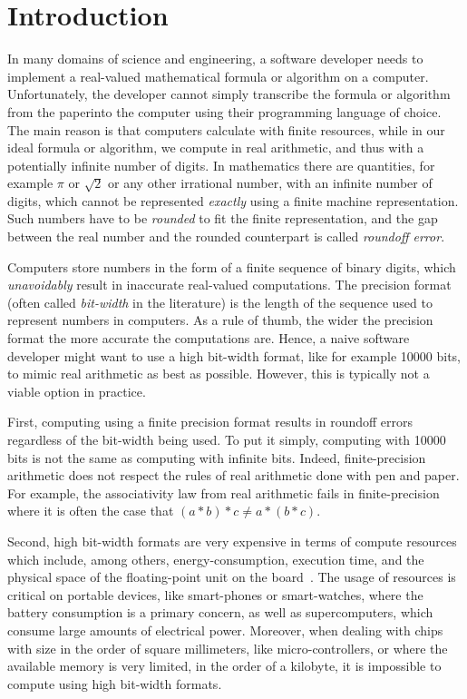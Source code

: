 
\chapter{Introduction}

\setupuuchapterbib
%
In many domains of science and engineering, a software developer needs to implement a real-valued mathematical formula or algorithm on a computer.
%
Unfortunately, the developer cannot simply transcribe the formula or algorithm \textquotesingle\textquotesingle from the paper\textquotesingle\textquotesingle \space into the computer using their programming language of choice.
%
The main reason is that computers calculate with finite resources, while in our ideal formula or algorithm, we compute in real arithmetic, and thus with a potentially infinite number of digits.
%
In mathematics there are quantities, for example $\pi$ or $\sqrt{2}$ or any other irrational number, with an infinite number of digits, which cannot be represented \emph{exactly} using a finite machine representation.
%
%
Such numbers have to be \emph{rounded} to fit the finite representation, and the gap between the real number and the rounded counterpart is called \emph{roundoff error}.
%

%
Computers store numbers in the form of a finite sequence of binary digits, which \emph{unavoidably} result in inaccurate real-valued computations.
%
The precision format (often called \emph{bit-width} in the literature) is the length of the sequence used to represent numbers in computers.
%
As a rule of thumb, the wider the precision format the more accurate the computations are.
%
Hence, a naive software developer might want to use a high bit-width format, like for example 10000 bits, to mimic real arithmetic as best as possible. 
%
However, this is typically not a viable option in practice.
%

First, computing using a finite precision format results in roundoff errors regardless of the bit-width being used.
%
To put it simply, computing with 10000 bits is not the same as computing with infinite bits.
%
Indeed, finite-precision arithmetic does not respect the rules of real arithmetic done with \textquotesingle \textquotesingle pen and paper\textquotesingle\textquotesingle.
%
For example, the associativity law from real arithmetic fails in finite-precision where it is often the case that $(a*b)*c \ne a*(b*c)$.

Second, high bit-width formats are very expensive in terms of compute resources which include, among others, energy-consumption, execution time, and the physical space of the floating-point unit on the board~\cite{fppower, lutnet}. 
%
The usage of resources is critical on portable devices, like smart-phones or smart-watches, where the battery consumption is a primary concern, as well as supercomputers, which consume large amounts of electrical power.
%
Moreover, when dealing with chips with size in the order of square millimeters, like micro-controllers, or where the available memory is very limited, in the order of a kilobyte, it is impossible to compute using high bit-width formats.

